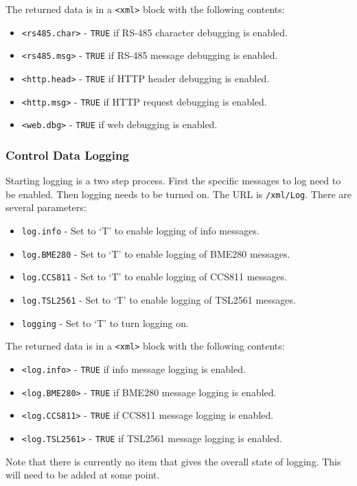 \documentclass[10pt, openany, draft]{article}
\begin{document}
The returned data is in a \texttt{<xml>} block with the following contents:
\begin{itemize}
  \item \texttt{<rs485.char>} - \texttt{TRUE} if RS-485 character debugging is enabled.
  \item \texttt{<rs485.msg>} - \texttt{TRUE} if RS-485 message debugging is enabled.
  \item \texttt{<http.head>} - \texttt{TRUE} if HTTP header debugging is enabled.
  \item \texttt{<http.msg>} - \texttt{TRUE} if HTTP request debugging is enabled.
  \item \texttt{<web.dbg>} - \texttt{TRUE} if web debugging is enabled.
\end{itemize}

\subsubsection{Control Data Logging}
Starting logging is a two step process.  First the specific messages to log need to be enabled.  Then logging needs to be turned on.  The URL is \texttt{/xml/Log}.  There are several parameters:
\begin{itemize}
  \item \texttt{log.info} - Set to `T' to enable logging of info messages.
  \item \texttt{log.BME280} - Set to `T' to enable logging of BME280 messages.
  \item \texttt{log.CCS811} - Set to `T' to enable logging of CCS811 messages.
  \item \texttt{log.TSL2561} - Set to `T' to enable logging of TSL2561 messages.
  \item \texttt{logging} - Set to `T' to turn logging on.
\end{itemize}

The returned data is in a \texttt{<xml>} block with the following contents:
\begin{itemize}
  \item \texttt{<log.info>} - \texttt{TRUE} if info message logging is enabled.
  \item \texttt{<log.BME280>} - \texttt{TRUE} if BME280 message logging is enabled.
  \item \texttt{<log.CCS811>} - \texttt{TRUE} if CCS811 message logging is enabled.
  \item \texttt{<log.TSL2561>} - \texttt{TRUE} if TSL2561 message logging is enabled.
\end{itemize}
Note that there is currently no item that gives the overall state of logging.  This will need to be added at some point.
\end{document}
